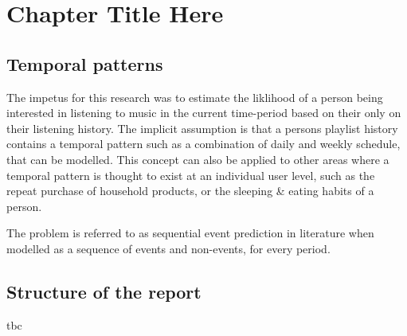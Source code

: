 
\chapter{Chapter Title Here} %

\label{Chapter1} %


\newcommand{\keyword}[1]{\textbf{#1}}
\newcommand{\tabhead}[1]{\textbf{#1}}
\newcommand{\code}[1]{\texttt{#1}}
\newcommand{\file}[1]{\texttt{\bfseries#1}}
\newcommand{\option}[1]{\texttt{\itshape#1}}


\section{Temporal patterns}
The impetus for this research was to estimate the liklihood of a person being interested in listening to music in the current time-period based on their only on their listening history. The implicit assumption is that a persons playlist history contains a temporal pattern such as a combination of daily and weekly schedule, that can be modelled. This concept can also be applied to other areas where a temporal pattern is thought to exist at an individual user level, such as the repeat purchase of household products, or the sleeping & eating habits of a person.

The problem is referred to as sequential event prediction in literature when modelled as a sequence of events and non-events, for every period.

\section{Structure of the report}
tbc

